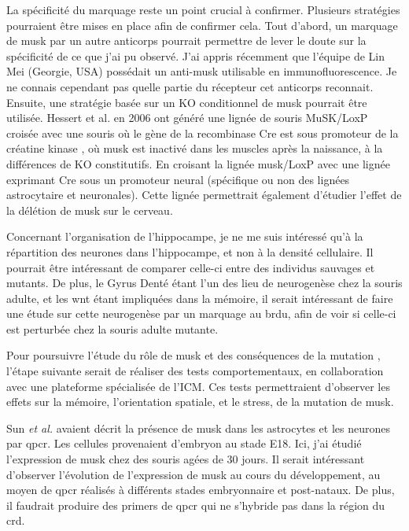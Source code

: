 La spécificité du marquage reste un point crucial à confirmer. Plusieurs stratégies pourraient être mises en place afin de confirmer cela. Tout d'abord, un marquage de \gls{musk} par un autre anticorps pourrait permettre de lever le doute sur la spécificité de ce que j'ai pu observé. J'ai appris récemment que l'équipe de Lin Mei (Georgie, USA) possédait un anti-\gls{musk} utilisable en immunofluorescence. Je ne connais cependant pas quelle partie du récepteur cet anticorps reconnait. Ensuite, une stratégie basée sur un KO conditionnel de \gls{musk} pourrait être utilisée. Hessert et al. en 2006 ont généré une lignée de souris MuSK/LoxP croisée avec une souris où le gène de la recombinase Cre est sous promoteur de la créatine kinase \cite{Hesser2006}, où \gls{musk} est inactivé dans les muscles après la naissance, à la différences de KO constitutifs. En croisant la lignée \gls{musk}/LoxP avec une lignée exprimant Cre sous un promoteur neural (spécifique ou non des lignées astrocytaire et neuronales). Cette lignée permettrait également d'étudier l'effet de la délétion de \gls{musk} sur le cerveau.

Concernant l'organisation de l'hippocampe, je ne me suis intéressé qu'à la répartition des neurones dans l'hippocampe, et non à la densité cellulaire. Il pourrait être intéressant de comparer celle-ci entre des individus sauvages et mutants. De plus, le Gyrus Denté étant l'un des lieu de neurogenèse chez la souris adulte, et les \gls{wnt} étant impliquées dans la mémoire, il serait intéressant de faire une étude sur cette neurogenèse par un marquage au \gls{brdu}, afin de voir si celle-ci est perturbée chez la souris adulte mutante.

Pour poursuivre l'étude du rôle de \gls{musk} et des conséquences de la mutation \mcrd, l'étape suivante serait de réaliser des tests comportementaux, en collaboration avec une plateforme spécialisée de l'ICM. Ces tests permettraient d'observer les effets sur la mémoire, l'orientation spatiale, et le stress, de la mutation de \gls{musk}.

Sun \emph{et al.} avaient décrit la présence de \gls{musk} dans les astrocytes et les neurones par \gls{qpcr}. Les cellules provenaient d'embryon au stade E18. Ici, j'ai étudié l'expression de \gls{musk} chez des souris agées de 30 jours. Il serait intéressant d'observer l'évolution de l'expression de \gls{musk} au cours du développement, au moyen de \gls{qpcr} réalisés à différents stades embryonnaire et post-nataux. De plus, il faudrait produire des primers de \gls{qpcr} qui ne s'hybride pas dans la région du \gls{crd}. 